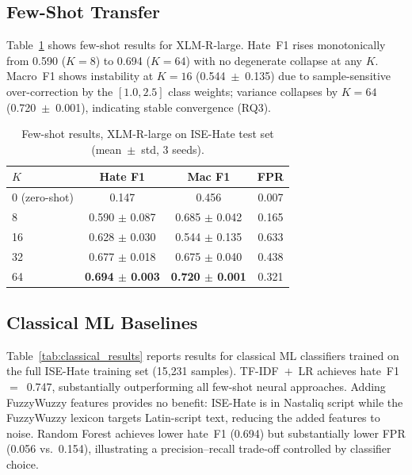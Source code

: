 \documentclass{article}
\begin{document}
\subsection{Few-Shot Transfer}

Table~\ref{tab:fs_results} shows few-shot results for XLM-R-large.
Hate~F1 rises monotonically from 0.590 ($K=8$) to 0.694 ($K=64$)
with no degenerate collapse at any $K$.
Macro~F1 shows instability at $K=16$ (0.544~$\pm$~0.135) due to
sample-sensitive over-correction by the $[1.0,2.5]$ class weights;
variance collapses by $K=64$ (0.720~$\pm$~0.001), indicating
stable convergence (RQ3).

\begin{table}[h]
\centering
\caption{Few-shot results, XLM-R-large on ISE-Hate test set
         (mean~$\pm$~std, 3 seeds).}
\label{tab:fs_results}
\vskip 0.05in
\begin{small}
\begin{tabular}{lccc}
\toprule
$K$ & Hate F1 & Mac F1 & FPR \\
\midrule
0 (zero-shot) & 0.147 & 0.456 & 0.007 \\
8  & 0.590 $\pm$ 0.087 & 0.685 $\pm$ 0.042 & 0.165 \\
16 & 0.628 $\pm$ 0.030 & 0.544 $\pm$ 0.135 & 0.633 \\
32 & 0.677 $\pm$ 0.018 & 0.675 $\pm$ 0.040 & 0.438 \\
64 & \textbf{0.694 $\pm$ 0.003} & \textbf{0.720 $\pm$ 0.001} & 0.321 \\
\bottomrule
\end{tabular}
\end{small}
\end{table}

\subsection{Classical ML Baselines}

Table~\ref{tab:classical_results} reports results for classical ML
classifiers trained on the full ISE-Hate training set (15{,}231 samples).
TF-IDF~$+$~LR achieves hate~F1~$=$~0.747, substantially outperforming
all few-shot neural approaches.
Adding FuzzyWuzzy features provides no benefit: ISE-Hate is in
Nastaliq script while the FuzzyWuzzy lexicon targets Latin-script text,
reducing the added features to noise.
Random Forest achieves lower hate~F1 (0.694) but substantially lower
FPR (0.056 vs.\ 0.154), illustrating a precision--recall trade-off
controlled by classifier choice.
\end{document}
